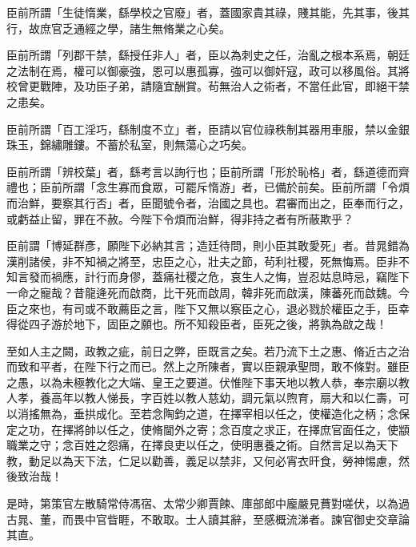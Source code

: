 \begin{pinyinscope}
 臣前所謂「生徒惰業，繇學校之官廢」者，蓋國家貴其祿，賤其能，先其事，後其行，故庶官乏通經之學，諸生無脩業之心矣。



 臣前所謂「列郡干禁，繇授任非人」者，臣以為刺史之任，治亂之根本系焉，朝廷之法制在焉，權可以御豪強，恩可以惠孤寡，強可以御奸寇，政可以移風俗。其將校曾更戰陣，及功臣子弟，請隨宜酬賞。茍無治人之術者，不當任此官，即絕干禁之患矣。



 臣前所謂「百工淫巧，繇制度不立」者，臣請以官位祿秩制其器用車服，禁以金銀珠玉，錦繡雕鏤。不蓄於私室，則無蕩心之巧矣。



 臣前所謂「辨校葉」者，繇考言以詢行也；臣前所謂「形於恥格」者，繇道德而齊禮也；臣前所謂「念生寡而食眾，可罷斥惰游」者，已備於前矣。臣前所謂「令煩而治鮮，要察其行否」者，臣聞號令者，治國之具也。君審而出之，臣奉而行之，或虧益止留，罪在不赦。今陛下令煩而治鮮，得非持之者有所蔽欺乎？



 臣前謂「博延群彥，願陛下必納其言；造廷待問，則小臣其敢愛死」者。昔晁錯為漢削諸侯，非不知禍之將至，忠臣之心，壯夫之節，茍利社稷，死無悔焉。臣非不知言發而禍應，計行而身僇，蓋痛社稷之危，哀生人之悔，豈忍姑息時忌，竊陛下一命之寵哉？昔龍逄死而啟商，比干死而啟周，韓非死而啟漢，陳蕃死而啟魏。今臣之來也，有司或不敢薦臣之言，陛下又無以察臣之心，退必戮於權臣之手，臣幸得從四子游於地下，固臣之願也。所不知殺臣者，臣死之後，將孰為啟之哉！



 至如人主之闕，政教之疵，前日之弊，臣既言之矣。若乃流下土之惠、脩近古之治而致和平者，在陛下行之而已。然上之所陳者，實以臣親承聖問，敢不條對。雖臣之愚，以為未極教化之大端、皇王之要道。伏惟陛下事天地以教人恭，奉宗廟以教人孝，養高年以教人悌長，字百姓以教人慈幼，調元氣以煦育，扇大和以仁壽，可以消搖無為，垂拱成化。至若念陶鈞之道，在擇宰相以任之，使權造化之柄；念保定之功，在擇將帥以任之，使脩閫外之寄；念百度之求正，在擇庶官面任之，使顓職業之守；念百姓之怨痛，在擇良吏以任之，使明惠養之術。自然言足以為天下教，動足以為天下法，仁足以勸善，義足以禁非，又何必宵衣旰食，勞神惕慮，然後致治哉！



 是時，第策官左散騎常侍馮宿、太常少卿賈餗、庫部郎中龐嚴見蕡對嗟伏，以為過古晁、董，而畏中官眥睚，不敢取。士人讀其辭，至感概流涕者。諫官御史交章論其直。




\end{pinyinscope}

